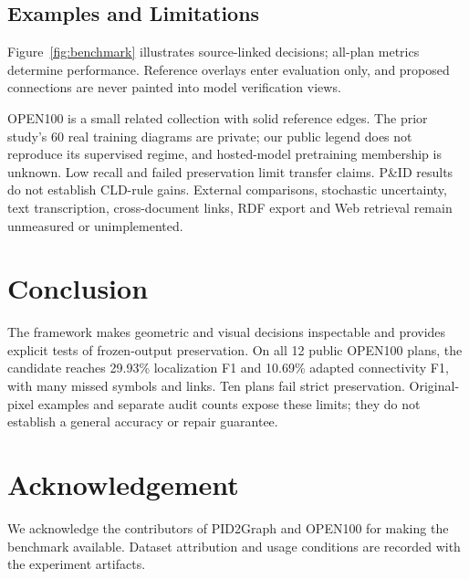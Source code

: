 \documentclass[sigconf,review]{acmart}
\begin{document}
\subsection{Examples and Limitations}
Figure~\ref{fig:benchmark} illustrates source-linked decisions; all-plan metrics determine performance. Reference overlays enter evaluation only, and proposed connections are never painted into model verification views.

OPEN100 is a small related collection with solid reference edges. The prior study's 60 real training diagrams are private; our public legend does not reproduce its supervised regime, and hosted-model pretraining membership is unknown. Low recall and failed preservation limit transfer claims. P\&ID results do not establish CLD-rule gains. External comparisons, stochastic uncertainty, text transcription, cross-document links, RDF export and Web retrieval remain unmeasured or unimplemented.

\section{Conclusion}
The framework makes geometric and visual decisions inspectable and provides explicit tests of frozen-output preservation. On all 12 public OPEN100 plans, the candidate reaches 29.93\% localization F1 and 10.69\% adapted connectivity F1, with many missed symbols and links. Ten plans fail strict preservation. Original-pixel examples and separate audit counts expose these limits; they do not establish a general accuracy or repair guarantee.

\section*{Acknowledgement}
We acknowledge the contributors of PID2Graph and OPEN100 for making the benchmark available. Dataset attribution and usage conditions are recorded with the experiment artifacts.



\end{document}
